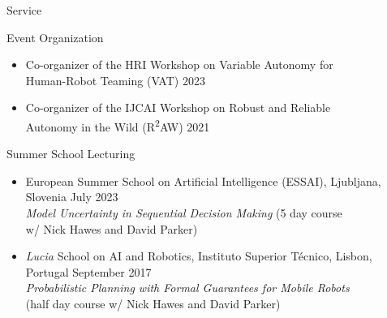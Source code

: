 
\begin{rSection}{Service}



\item Event Organization
\begin{itemize}
\item Co-organizer of the HRI Workshop on Variable Autonomy for \\ Human-Robot Teaming (VAT) \hfill 2023
\item Co-organizer of the IJCAI  Workshop on  Robust and Reliable \\ Autonomy in the Wild (R\textsuperscript{2}AW) \hfill 2021
\end{itemize}

\item Summer School Lecturing
\begin{itemize}
\item European Summer School on Artificial Intelligence (ESSAI), Ljubljana,\\ Slovenia \hfill July 2023\\
\textit{Model Uncertainty in Sequential Decision Making} (5 day course \\ w/ Nick Hawes and David Parker)
\item  \emph{Lucia}  School on AI and Robotics, Instituto Superior T\'{e}cnico, Lisbon, \\Portugal \hfill September 2017\\
\textit{Probabilistic Planning with Formal Guarantees for Mobile Robots} \\(half day course w/ Nick Hawes and David Parker)
\end{itemize}



\end{rSection}
